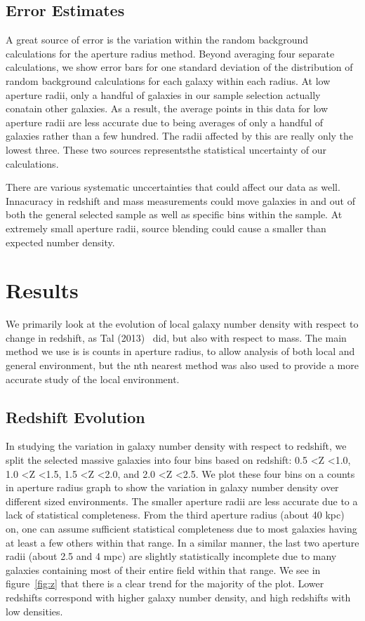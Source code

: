 \documentclass[apj]{emulateapj}
\begin{document}
\subsection{Error Estimates}

A great source of error is the variation within the random background calculations for the aperture radius method. Beyond averaging four separate calculations, we show error bars for one standard deviation of the distribution of random background calculations for each galaxy within each radius. At low aperture radii, only a handful of galaxies in our sample selection actually conatain other galaxies. As a result, the average points in this data for low aperture radii are less accurate due to being averages of only a handful of galaxies rather than a few hundred. The radii affected by this are really only the lowest three. These two sources representsthe statistical uncertainty of our calculations.

There are various systematic unccertainties that could affect our data as well. Innacuracy in redshift and mass measurements could move galaxies in and out of both the general selected sample as well as specific bins within the sample. At extremely small aperture radii, source blending could cause a smaller than expected number density. 

\section{Results}

We primarily look at the evolution of local galaxy number density with respect to change in redshift, as Tal (2013)~\cite{2013ApJ...769...31T} did, but also with respect to mass. The main method we use is is counts in aperture radius, to allow analysis of both local and general environment, but the nth nearest method was also used to provide a more accurate study of the local environment.

\subsection{Redshift Evolution}

In studying the variation in galaxy number density with respect to redshift, we split the selected massive galaxies into four bins based on redshift: 0.5 \textless Z \textless 1.0, 1.0 \textless Z \textless 1.5, 1.5 \textless Z \textless 2.0, and 2.0 \textless Z \textless 2.5. We plot these four bins on a counts in aperture radius graph to show the variation in galaxy number density over different sized environments. The smaller aperture radii are less accurate due to a lack of statistical completeness. From the third aperture radius (about 40 kpc) on, one can assume sufficient statistical completeness due to most galaxies having at least a few others within that range. In a similar manner, the last two aperture radii (about 2.5 and 4 mpc) are slightly statistically incomplete due to many galaxies containing most of their entire field within that range. We see in figure~\ref{fig:z} that there is a clear trend for the majority of the plot. Lower redshifts correspond with higher galaxy number density, and high redshifts with low densities. 
\end{document}
